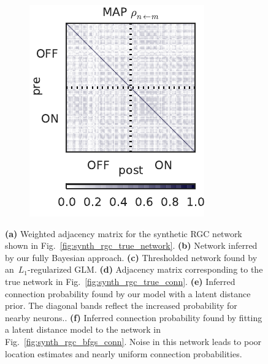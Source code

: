 \begin{figure}[t!]
\begin{subfigure}[b]{1.8in}
    \includegraphics[width=\textwidth]{figures/ch3/synth_rgc_bfgs_prob_conn.pdf}
    \label{fig:synth_rgc_bfgs_prob_conn}
  \end{subfigure}
  \caption[Inferred connection probabilities for synthetic RGC data]{
    \textbf{(a)} Weighted adjacency matrix for the synthetic RGC network shown in Fig.~\ref{fig:synth_rgc_true_network}.
    \textbf{(b)} Network inferred by our fully Bayesian approach.
    \textbf{(c)} Thresholded network found by an~$L_1$-regularized GLM.
    \textbf{(d)} Adjacency matrix corresponding to the true network in Fig.~\ref{fig:synth_rgc_true_conn}.
    \textbf{(e)} Inferred connection probability found by our model with a latent distance prior. The diagonal bands reflect the increased probability for nearby neurons..
    \textbf{(f)} Inferred connection probability found by fitting a latent distance model to the network in Fig.~\ref{fig:synth_rgc_bfgs_conn}. Noise in this network leads to poor location estimates and nearly uniform connection probabilities.
  }
  \label{fig:synth_rgc_prob_conn}
\end{figure}

